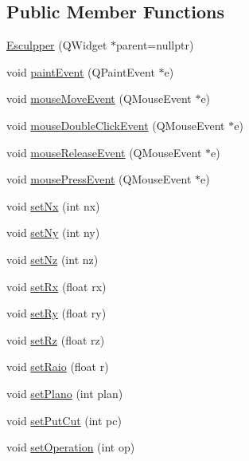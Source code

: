 \subsection*{Public Member Functions}
\begin{DoxyCompactItemize}
\item 
\mbox{\hyperlink{class_esculpper_a89d2a33b5b2cebd4b06a938fed3c7d3b}{Esculpper}} (Q\+Widget $\ast$parent=nullptr)
\item 
void \mbox{\hyperlink{class_esculpper_a857692bdb93c3fdbb4ace4d2f90d802b}{paint\+Event}} (Q\+Paint\+Event $\ast$e)
\item 
void \mbox{\hyperlink{class_esculpper_a8c0c963246cb180fff88fdcbf0423feb}{mouse\+Move\+Event}} (Q\+Mouse\+Event $\ast$e)
\item 
void \mbox{\hyperlink{class_esculpper_abac370c50c860249867ded72f7b662db}{mouse\+Double\+Click\+Event}} (Q\+Mouse\+Event $\ast$e)
\item 
void \mbox{\hyperlink{class_esculpper_ad0d057e7bde9519e973d54fabe306f99}{mouse\+Release\+Event}} (Q\+Mouse\+Event $\ast$e)
\item 
void \mbox{\hyperlink{class_esculpper_adae0aea7485c46aae427c3303db1bad4}{mouse\+Press\+Event}} (Q\+Mouse\+Event $\ast$e)
\item 
void \mbox{\hyperlink{class_esculpper_a9a6e875cc60b1712b468ae500d95abd0}{set\+Nx}} (int nx)
\item 
void \mbox{\hyperlink{class_esculpper_ab26afe21f9a86beca089a9ba2feda6fc}{set\+Ny}} (int ny)
\item 
void \mbox{\hyperlink{class_esculpper_a85deaa290e0a2b9e0e143c235252b1de}{set\+Nz}} (int nz)
\item 
void \mbox{\hyperlink{class_esculpper_a2cbc4c7888ad77bfbe4977121158cd4d}{set\+Rx}} (float rx)
\item 
void \mbox{\hyperlink{class_esculpper_a1b2e3090d8ff1affd19d2b3935c645d2}{set\+Ry}} (float ry)
\item 
void \mbox{\hyperlink{class_esculpper_a19c5064c0d1f5b22b3650fba22b9ed3a}{set\+Rz}} (float rz)
\item 
void \mbox{\hyperlink{class_esculpper_ac64b70c52eecda057ecb1ae1278ae110}{set\+Raio}} (float r)
\item 
void \mbox{\hyperlink{class_esculpper_a8590fa3cbbbf52cd04ca44b2b06ed0bf}{set\+Plano}} (int plan)
\item 
void \mbox{\hyperlink{class_esculpper_a7ba4d36fc926e31737011d344385492c}{set\+Put\+Cut}} (int pc)
\item 
void \mbox{\hyperlink{class_esculpper_a7e83952f6516f052cb55eb271e31fa65}{set\+Operation}} (int op)

\end{DoxyCompactItemize}
